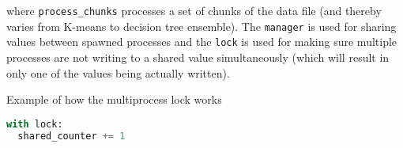 where \texttt{process\_chunks} processes a set of chunks of the data file (and
thereby varies from K-means to decision tree ensemble). The \texttt{manager}
is used for sharing values between spawned processes and the \texttt{lock} is
used for making sure multiple processes are not writing to a shared value
simultaneously (which will result in only one of the values being actually
written).

Example of how the multiprocess lock works
\begin{lstlisting}[language=python]
with lock:
  shared_counter += 1
\end{lstlisting}
